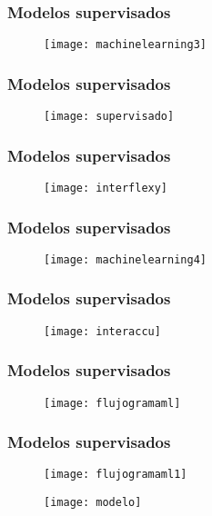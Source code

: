 \documentclass[14pt]{beamer}
\begin{document}
 \begin{frame}
 \frametitle{Modelos supervisados}
  \begin{figure}
    \centering
    \texttt{[image: machinelearning3]}
  \end{figure}
\end{frame}
 \begin{frame}
 \frametitle{Modelos supervisados}
  \begin{figure}
    \centering
    \texttt{[image: supervisado]}
  \end{figure}
\end{frame}
 \begin{frame}
 \frametitle{Modelos supervisados}
  \begin{figure}
    \centering
    \texttt{[image: interflexy]}
  \end{figure}
\end{frame}
 \begin{frame}
 \frametitle{Modelos supervisados}
  \begin{figure}
    \centering
    \texttt{[image: machinelearning4]}
  \end{figure}
\end{frame}
 \begin{frame}
 \frametitle{Modelos supervisados}
  \begin{figure}
    \centering
    \texttt{[image: interaccu]}
  \end{figure}
\end{frame}
 \begin{frame}
 \frametitle{Modelos supervisados}
  \begin{figure}
    \centering
    \texttt{[image: flujogramaml]}
  \end{figure}
\end{frame}
 \begin{frame}
 \frametitle{Modelos supervisados}
  \begin{figure}
    \centering
    \texttt{[image: flujogramaml1]}
  \end{figure}
\end{frame}
\begin{frame}
  \begin{figure}
    \centering
    \texttt{[image: modelo]}
  \end{figure}
\end{frame}
\end{document}
